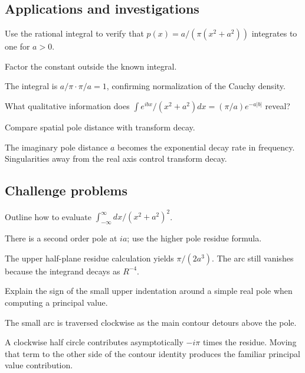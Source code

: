 \subsection*{Applications and investigations}

\begin{exercise}\label{exr:iv11-expand-13}
Use the rational integral to verify that \(p(x)=a/(\pi(x^2+a^2))\) integrates to one for \(a>0\).
\end{exercise}
\begin{hint}
Factor the constant outside the known integral.
\end{hint}
\begin{solution}
The integral is \(a/\pi\cdot\pi/a=1\), confirming normalization of the Cauchy density.
\end{solution}

\begin{exercise}\label{exr:iv11-expand-14}
What qualitative information does \(\int e^{ibx}/(x^2+a^2)dx=(\pi/a)e^{-a|b|}\) reveal?
\end{exercise}
\begin{hint}
Compare spatial pole distance with transform decay.
\end{hint}
\begin{solution}
The imaginary pole distance \(a\) becomes the exponential decay rate in frequency. Singularities away from the real axis control transform decay.
\end{solution}

\subsection*{Challenge problems}

\begin{exercise}\label{exr:iv11-expand-15}
Outline how to evaluate \(\int_{-\infty}^{\infty}dx/(x^2+a^2)^2\).
\end{exercise}
\begin{hint}
There is a second order pole at \(ia\); use the higher pole residue formula.
\end{hint}
\begin{solution}
The upper half-plane residue calculation yields \(\pi/(2a^3)\). The arc still vanishes because the integrand decays as \(R^{-4}\).
\end{solution}

\begin{exercise}\label{exr:iv11-expand-16}
Explain the sign of the small upper indentation around a simple real pole when computing a principal value.
\end{exercise}
\begin{hint}
The small arc is traversed clockwise as the main contour detours above the pole.
\end{hint}
\begin{solution}
A clockwise half circle contributes asymptotically \(-i\pi\) times the residue. Moving that term to the other side of the contour identity produces the familiar principal value contribution.
\end{solution}


